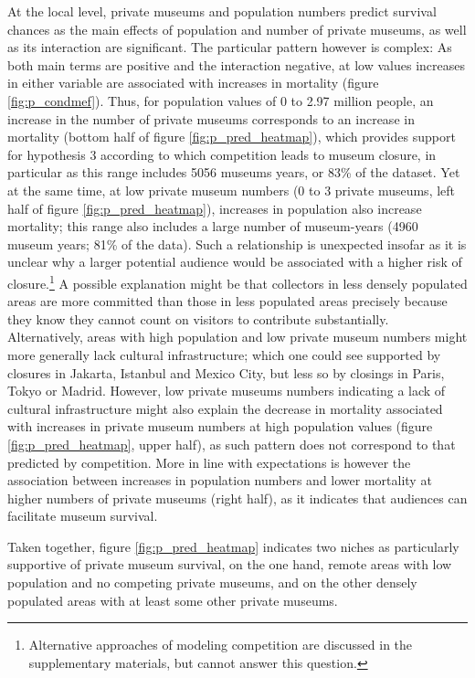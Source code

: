 \documentclass[12pt]{article}
\begin{document}
At the local level, private museums and population numbers predict survival chances as the main effects of population and number of private museums, as well as its interaction are significant.
The particular pattern however is complex:
As both main terms are positive and the interaction negative, at low values increases in either variable are associated with increases in mortality (figure \ref{fig:p_condmef}).
Thus, for population values of 0 to 2.97 million people, an increase in the number of private museums corresponds to an increase in mortality (bottom half of figure \ref{fig:p_pred_heatmap}), which provides support for hypothesis 3 according to which competition leads to museum closure, in particular as this range includes 5056 museums years, or 83\% of the dataset. 
Yet at the same time, at low private museum numbers (0 to 3 private museums, left half of figure \ref{fig:p_pred_heatmap}), increases in population also increase mortality; this range also includes a large number of museum-years (4960 museum years; 81\% of the data).
Such a relationship is unexpected insofar as it is unclear why a larger potential audience would be associated with a higher risk of closure.\footnote{Alternative approaches of modeling competition are discussed in the supplementary materials, but cannot answer this question.}
A possible explanation might be that collectors in less densely populated areas are more committed than those in less populated areas precisely because they know they cannot count on visitors to contribute substantially.
Alternatively, areas with high population and low private museum numbers might more generally lack cultural infrastructure; which one could see supported by closures in Jakarta, Istanbul and Mexico City, but less so by closings in Paris, Tokyo or Madrid.
However, low private museums numbers indicating a lack of cultural infrastructure might also explain the decrease in mortality associated with increases in private museum numbers at high population values (figure \ref{fig:p_pred_heatmap}, upper half), as such pattern does not correspond to that predicted by competition.
More in line with expectations is however the association between increases in population numbers and lower mortality at higher numbers of private museums (right half), as it indicates that audiences can facilitate museum survival.


Taken together, figure \ref{fig:p_pred_heatmap} indicates two niches as particularly supportive of private museum survival, on the one hand, remote areas with low population and no competing private museums, and on the other densely populated areas with at least some other private museums.
\end{document}
